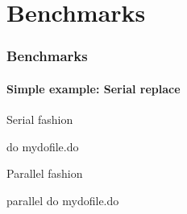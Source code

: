 \documentclass[9pt,\ExtraDocOpts]{beamer}
\begin{document}
%

\section{Benchmarks}
\frame{\tableofcontents[currentsection]}

\begin{frame}[b,fragile]
\frametitle{Benchmarks}
\framesubtitle{Simple example: Serial replace}

\begin{minipage}[c]{1\textwidth}
\begin{minipage}[c]{.35\textwidth}
Serial fashion
\begin{semiverbatim}\scriptsize
do mydofile.do
\end{semiverbatim}
Parallel fashion
\begin{semiverbatim}\scriptsize
parallel do mydofile.do
\end{semiverbatim}
\end{minipage}
\end{minipage}


\end{frame}
\end{document}
